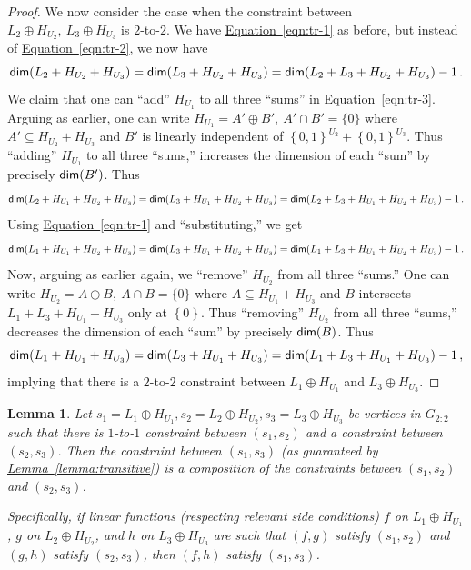 \documentclass[11pt]{article}
\numberwithin{equation}{section}
\newtheorem{lemma}[theorem]{Lemma}
\theoremstyle{definition}
\theoremstyle{plain}
\newcommand{\expref}[2]{\hyperref[#2]{#1~\ref{#2}}}
\newcommand{\expeqref}[2]{\hyperref[#2]{#1~\eqref{#2}}}
\newcommand\set[1]{{\left\{ #1 \right\}}}
\newcommand\power[1]{\set{0,1}^{#1}}
\newcommand*\xor{\mathbin{\oplus}}
\begin{document}
\begin{proof}
\medskip
We now consider the case when the constraint between $L_2\xor H_{U_2}, ~L_3\xor H_{U_3}$ is $2$-to-$2$. We have \expeqref{Equation}{eqn:tr-1} as before,
but instead of \expeqref{Equation}{eqn:tr-2}, we now have
\begin{equation} \label{eqn:tr-3}
{\sf dim}(L_2+ H_{U_2}+ H_{U_3}) = {\sf dim}(L_3+ H_{U_2}+ H_{U_3}) = {\sf dim}(L_2+ L_3+ H_{U_2}+ H_{U_3})-1\,.%
\end{equation}
We claim that one can ``add'' $H_{U_1}$ to all three ``sums'' in \expeqref{Equation}{eqn:tr-3}. Arguing as earlier, one can write $H_{U_1} = A' \xor B', ~A' \cap B' = \{0\}$ where
$A' \subseteq H_{U_2}+ H_{U_3}$ and $B'$ is linearly independent of $\power{U_2}+ \power{U_3}$. Thus ``adding'' $H_{U_1}$ to all three ``sums,'' increases
the dimension of each ``sum'' by precisely ${\sf dim}(B')$. Thus
\[
{\sf dim}(L_2+ H_{U_1} + H_{U_2}+ H_{U_3}) = {\sf dim}(L_3+ H_{U_1} + H_{U_2}+ H_{U_3}) = {\sf dim}(L_2+ L_3+ H_{U_1} + H_{U_2}+ H_{U_3})-1\,.%
\]
Using \expeqref{Equation}{eqn:tr-1} and ``substituting,'' we get
\[
{\sf dim}(L_1+ H_{U_1} + H_{U_2}+ H_{U_3}) = {\sf dim}(L_3+ H_{U_1} + H_{U_2}+ H_{U_3}) = {\sf dim}(L_1+ L_3+ H_{U_1} + H_{U_2}+ H_{U_3})-1\,.%
\]
Now, arguing as earlier again, we ``remove'' $H_{U_2}$ from all three ``sums.'' One can write $H_{U_2} =  A \xor B, ~A \cap B = \{0\}$ where
$A \subseteq H_{U_1}+ H_{U_3}$ and $B$ intersects $L_1+ L_3+ H_{U_1} + H_{U_3}$ only at $\set{0}$. Thus ``removing'' $H_{U_2}$ from  all three ``sums,'' decreases
the dimension of each ``sum'' by precisely ${\sf dim}(B)$. Thus
\[
{\sf dim}(L_1+ H_{U_1} + H_{U_3}) = {\sf dim}(L_3+ H_{U_1} + H_{U_3}) = {\sf dim}(L_1+ L_3+ H_{U_1} + H_{U_3})-1\,,%
\]
implying that there is a $2$-to-$2$ constraint between $L_1 \xor H_{U_1}$ and $L_3 \xor H_{U_3}$.
\end{proof}




\begin{lemma}\label{lemma:constraint_composition}
Let $s_1 = L_1\xor H_{U_1},  s_2 = L_2\xor H_{U_2}, s_3 = L_3\xor H_{U_3}$
be vertices in $G_{2:2}$ such that there is $1$-to-$1$ constraint between $(s_1, s_2)$ and a constraint between $(s_2, s_3)$.
Then the  constraint between $(s_1, s_3)$ (as guaranteed by \expref{Lemma}{lemma:transitive}) is a composition of the constraints
between $(s_1, s_2)$ and $(s_2, s_3)$.

Specifically, if linear functions (respecting relevant side
conditions) $f$ on $L_1 \xor H_{U_1}$, $g$ on $L_2 \xor H_{U_2}$, and $h$ on $L_3\xor H_{U_3}$ are such that
  $(f,g)$ satisfy $(s_1, s_2)$ and
  $(g,h)$ satisfy $(s_2, s_3)$,
then $(f,h)$ satisfy $(s_1, s_3)$.
\end{lemma}
\end{document}
